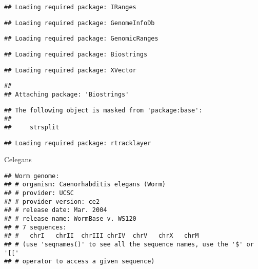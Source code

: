 \documentclass[]{article}
\newenvironment{Shaded}{\begin{snugshade}}{\end{snugshade}}
\newcommand{\OperatorTok}[1]{\textcolor[rgb]{0.81,0.36,0.00}{\textbf{#1}}}
\newcommand{\NormalTok}[1]{#1}
\begin{document}
\begin{verbatim}
## Loading required package: IRanges
\end{verbatim}

\begin{verbatim}
## Loading required package: GenomeInfoDb
\end{verbatim}

\begin{verbatim}
## Loading required package: GenomicRanges
\end{verbatim}

\begin{verbatim}
## Loading required package: Biostrings
\end{verbatim}

\begin{verbatim}
## Loading required package: XVector
\end{verbatim}

\begin{verbatim}
## 
## Attaching package: 'Biostrings'
\end{verbatim}

\begin{verbatim}
## The following object is masked from 'package:base':
## 
##     strsplit
\end{verbatim}

\begin{verbatim}
## Loading required package: rtracklayer
\end{verbatim}

\begin{Shaded}
\begin{Highlighting}[]
\NormalTok{Celegans}
\end{Highlighting}
\end{Shaded}

\begin{verbatim}
## Worm genome:
## # organism: Caenorhabditis elegans (Worm)
## # provider: UCSC
## # provider version: ce2
## # release date: Mar. 2004
## # release name: WormBase v. WS120
## # 7 sequences:
## #   chrI   chrII  chrIII chrIV  chrV   chrX   chrM                       
## # (use 'seqnames()' to see all the sequence names, use the '$' or '[['
## # operator to access a given sequence)
\end{verbatim}

\begin{Shaded}
\end{Shaded}
\end{document}

